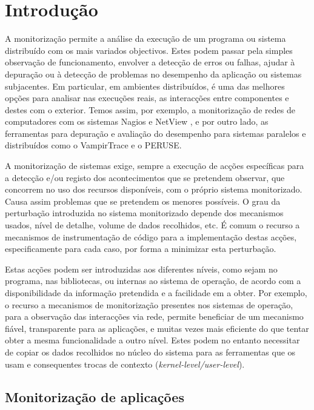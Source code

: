 \documentclass[a4paper]{llncs}
\begin{document}
\section{Introdução}
\label{sec:introduction}

A monitorização permite a análise da execução de um programa ou sistema distribuído com os mais variados objectivos.
 Estes podem passar pela simples observação de funcionamento, envolver a detecção de erros ou falhas, ajudar à depuração ou à detecção de problemas no desempenho da aplicação ou sistemas subjacentes.
 Em particular, em ambientes distribuídos, é uma das melhores opções para analisar nas execuções reais, as interacções entre componentes e destes com o exterior. 
Temos assim, por exemplo, a monitorização de redes de computadores com os sistemas Nagios \cite{Nagios} e NetView \cite{netview}, e por outro lado, as ferramentas para depuração e avaliação do desempenho para sistemas paralelos e distribuídos como o VampirTrace\cite{vampir:2008} e o PERUSE\cite{keller06}.

A monitorização de sistemas exige, sempre a execução de acções específicas para a detecção e/ou registo dos acontecimentos que se pretendem observar, que concorrem no uso dos recursos disponíveis, com o próprio sistema monitorizado.
 Causa assim problemas que se pretendem os menores possíveis.
 O grau da perturbação introduzida no sistema monitorizado depende dos mecanismos usados, nível de detalhe, volume de dados recolhidos, etc.  
É comum o recurso a mecanismos de instrumentação de código para a implementação destas acções, especificamente para cada caso, por forma a minimizar esta perturbação.

Estas acções podem ser introduzidas aos diferentes níveis, como sejam no programa, nas bibliotecas, ou internas ao sistema de operação, de acordo com a disponibilidade da informação pretendida e a facilidade em a obter.
Por exemplo, o recurso a mecanismos de monitorização presentes nos sistemas de operação, para a observação das interacções via rede, permite beneficiar de um mecanismo fiável, transparente para as aplicações, e muitas vezes mais eficiente do que tentar obter a mesma funcionalidade a outro nível.
 Estes podem no entanto necessitar de copiar os dados recolhidos no núcleo do sistema para as ferramentas que os usam e consequentes trocas de contexto (\emph{kernel-level/user-level}).

\subsection{Monitorização de aplicações}
\label{sub:user_level_monitor}
\end{document}
